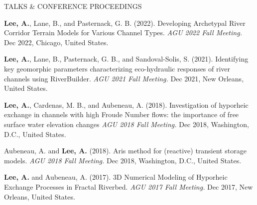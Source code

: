 \documentclass{resume_anzy} %
\begin{document}
\begin{rSection}{TALKS \& CONFERENCE PROCEEDINGS}
\item [8] \textbf{Lee, A.}, Lane, B., and Pasternack, G. B. (2022). Developing Archetypal River Corridor Terrain Models for Various Channel Types. \textit{AGU 2022 Fall Meeting.} Dec 2022, Chicago, United States.

\item [9] \textbf{Lee, A.}, Lane, B., Pasternack, G. B., and Sandoval-Solis, S. (2021). Identifying key geomorphic parameters characterizing eco-hydraulic responses of river channels using RiverBuilder. \textit{AGU 2021 Fall Meeting.} Dec 2021, New Orleans, United States.

\item [10] \textbf{Lee, A.}, Cardenas, M. B., and Aubeneau, A. (2018). Investigation of hyporheic exchange in channels with high Froude Number flows: the importance of free surface water elevation changes \textit{AGU 2018 Fall Meeting.} Dec 2018, Washington, D.C., United States. 

\item [11] Aubeneau, A. and \textbf{Lee, A.} (2018). Aris method for (reactive) transient storage models. \textit{AGU 2018 Fall Meeting.} Dec 2018, Washington, D.C., United States.

\item [12] \textbf{Lee, A.} and Aubeneau, A. (2017). 3D Numerical Modeling of Hyporheic Exchange Processes in Fractal Riverbed. \textit{AGU 2017 Fall Meeting.} Dec 2017, New Orleans, United States.

\end{rSection}



\end{document}
